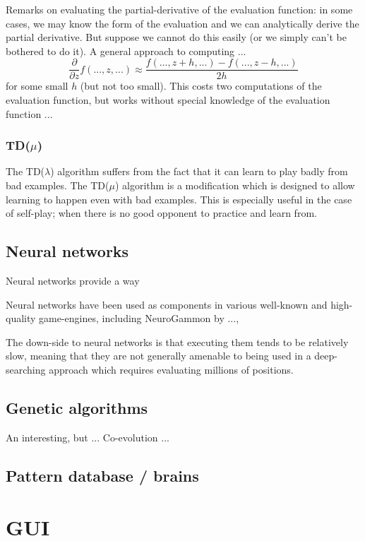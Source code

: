 \documentclass[10pt,dvipdfmx]{report}
\begin{document}
Remarks on evaluating the partial-derivative of the evaluation function: in some cases,
we may know the form of the evaluation and we can analytically derive the partial derivative.
But suppose we cannot do this easily (or we simply can't be bothered to do it).
A general approach to computing ...
\[ \frac{\partial}{\partial z}f(..., z, ...) \approx \frac{f(..., z+h, ...) - f(..., z-h, ...)}{2h} \]
for some small $h$ (but not too small).  This costs two computations of the evaluation function, but
works without special knowledge of the evaluation function ...

\subsection{TD($\mu$)}
The TD($\lambda$) algorithm suffers from the fact that it can learn to play
badly from bad examples.  The TD($\mu$) algorithm is a modification which is
designed to allow learning to happen even with bad examples.  This is especially
useful in the case of self-play; when there is no good opponent to practice and
learn from.

\section{Neural networks}
Neural networks provide a way 

Neural networks have been used as components in various well-known and high-quality
game-engines, including NeuroGammon by ..., 

The down-side to neural networks is that executing them tends to be relatively slow, meaning that
they are not generally amenable to being used in a deep-searching approach which requires evaluating
millions of positions.

\section{Genetic algorithms}
An interesting, but ...
Co-evolution ...
\section{Pattern database / brains}

\chapter{GUI}
\label{chap-gui}
\end{document}

